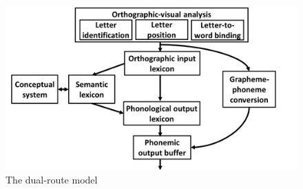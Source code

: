\begin{figure}[h]
\vspace{.3in}
\includegraphics[width=\linewidth]{Figures/Ch1/DualRoute}
\caption{The dual-route model \citep{friedmann2016types}}
\end{figure}

